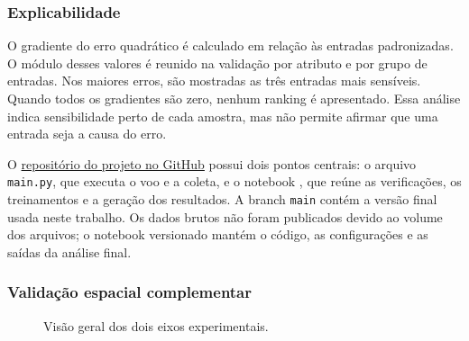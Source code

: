 \documentclass[article,a4paper,12pt,brazil,sumario=tradicional]{abntex2}
\begin{document}
\subsubsection{Explicabilidade}

O gradiente do erro quadrático é calculado em relação às entradas padronizadas. O módulo desses valores é reunido na validação por atributo e por grupo de entradas. Nos maiores erros, são mostradas as três entradas mais sensíveis. Quando todos os gradientes são zero, nenhum ranking é apresentado. Essa análise indica sensibilidade perto de cada amostra, mas não permite afirmar que uma entrada seja a causa do erro.

O \href{https://github.com/Gabriel-Panza/TCC_Drone}{repositório do projeto no GitHub} possui dois pontos centrais: o arquivo \texttt{main.py}, que executa o voo e a coleta, e o notebook , que reúne as verificações, os treinamentos e a geração dos resultados. A branch \texttt{main} contém a versão final usada neste trabalho. Os dados brutos não foram publicados devido ao volume dos arquivos; o notebook versionado mantém o código, as configurações e as saídas da análise final.

\subsubsection{Validação espacial complementar}

\begin{figure}[htb]
\centering
{}
\caption{Visão geral dos dois eixos experimentais.}
\label{fig:artigo-fluxo-dois-eixos}
\end{figure}
\end{document}
